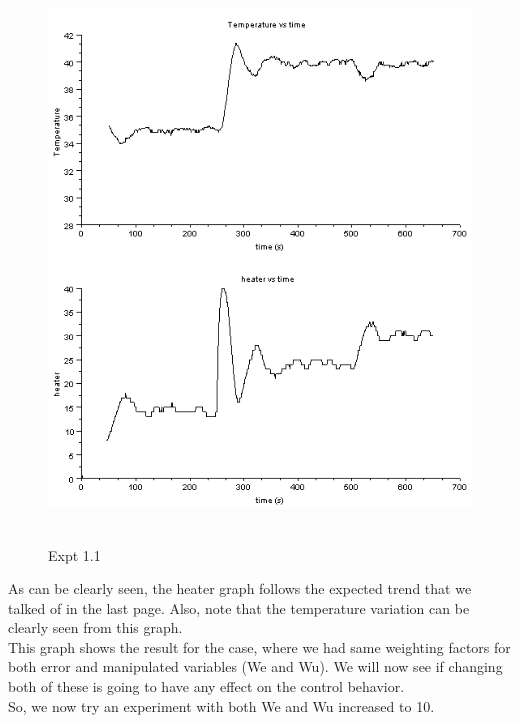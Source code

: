 \begin{figure}[H]
  \includegraphics[width=12cm, height=15cm]{mpc/1_1_heater_final.png}
  \caption{Expt 1.1}
\end{figure}
As can be clearly seen, the heater graph follows the expected trend that we talked of in the last page. Also, note that the temperature variation can be clearly seen from this graph. \\
This graph shows the result for the case, where we had same weighting factors for both error and manipulated variables (We and Wu). We will now see if changing both of these is going to have any effect on the control behavior. \\
So, we now try an experiment with both We and Wu increased to 10.


